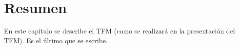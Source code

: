 \chapter*{Resumen}

En este capítulo se describe el TFM (como se realizará en la
presentación del TFM). Es el último que se escribe.
